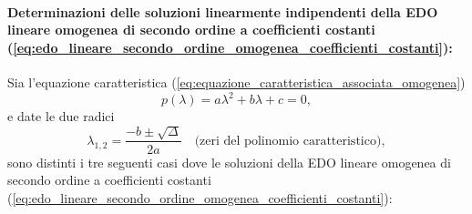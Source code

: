 \paragraph{Determinazioni delle soluzioni linearmente indipendenti della EDO lineare omogenea di secondo ordine a coefficienti costanti (\ref{eq:edo_lineare_secondo_ordine_omogenea_coefficienti_costanti}):} Sia l'equazione caratteristica (\ref{eq:equazione_caratteristica_associata_omogenea})
\begin{equation*}
	p(\lambda) = a\lambda^2 + b\lambda + c = 0,
\end{equation*}
e date le due radici
\begin{equation*}
	\lambda_{1,2}=\frac{-b\pm\sqrt{\Delta}}{2a}\quad \text{(zeri del polinomio caratteristico)},
\end{equation*}
sono distinti i tre seguenti casi dove le soluzioni della EDO lineare omogenea di secondo ordine a coefficienti costanti (\ref{eq:edo_lineare_secondo_ordine_omogenea_coefficienti_costanti}):
